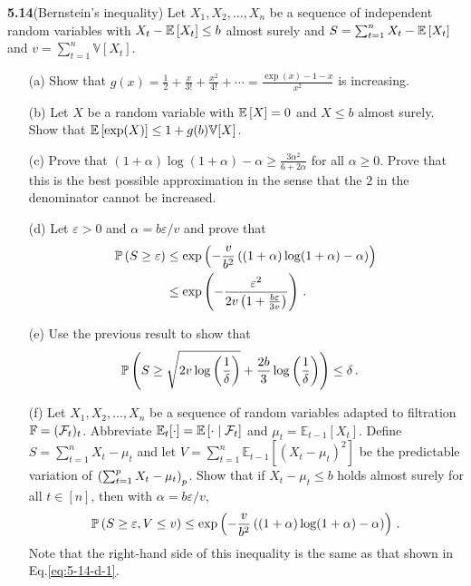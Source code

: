 \noindent \textbf{5.14}(Bernstein’s inequality) Let $X_1,X_2,\ldots,X_n$ be a sequence of independent random variables with $X_t - \mathbb{E} \left[X_t\right] \le b$ almost surely and $S= \sum_{t=1}^n X_t -\mathbb{E} \left[X_t\right]$ and $v = \sum_{t=1}^n \mathbb{V}[X_t]$.
\begin{enumerate}
	\item[(a)] Show that $g(x) = \frac{1}{2} + \frac{x}{3!}+\frac{x^2}{4!}+\cdots = \frac{\exp (x) - 1 -x}{x^2}$ is increasing.
	\item[(b)] Let $X$ be a random variable with $\mathbb{E} \left[X\right]=0$ and $X\le b$ almost surely. Show that $\mathbb{E} \left[\exp (X)\right] \le 1+g(b)\mathbb{V}[X]$.
	\item[(c)] Prove that $(1+\alpha)\log(1+\alpha) - \alpha \ge \frac{3\alpha^2}{6+2\alpha}$ for all $\alpha\ge 0$. Prove that this is the best possible approximation in the sense that the $2$ in the denominator cannot be increased.
	\item[(d)] Let $\varepsilon > 0$ and $\alpha = b\varepsilon/v$ and prove that
	\begin{align}
		\mathbb{P} \left(S\ge \varepsilon\right) &\le \exp\left( -\frac{v}{b^2}\left( (1+\alpha)\log(1+\alpha) -\alpha\right) \right) \label{eq:5-14-d-1}\\
		&\le \exp\left(- \frac{\varepsilon^2}{2v\left( 1+\frac{b\varepsilon}{3v} \right)} \right) \label{eq:5-14-d-2}\,.
	\end{align}
	\item[(e)] Use the previous result to show that
	\begin{align*}
		\mathbb{P} \left(S\ge \sqrt{2v \log\left(\frac{1}{\delta}\right)}+ \frac{2b}{3}\log\left(\frac{1}{\delta}\right)\right)  &\le \delta \,.
	\end{align*}
	\item[(f)] Let $X_1,X_2,\ldots,X_n$ be a sequence of random variables adapted to filtration $\mathbb{F} = (\mathcal{F}_t)_t$. Abbreviate $\mathbb{E}_t[\cdot] = \mathbb{E} \left[\cdot \mid \mathcal{F}_t\right]$ and $\mu_t = \mathbb{E}_{t-1}[X_t]$. Define $S = \sum_{t=1}^n X_t - \mu_t$ and let $V = \sum_{t=1}^n \mathbb{E}_{t-1}[(X_t - \mu_t)^2]$ be the predictable variation of $\left(\sum_{t=1}^p X_t-\mu_t \right)_p$. Show that if $X_t - \mu_t \le b$ holds almost surely for all $t \in [n]$, then with $\alpha = b\varepsilon / v$, 
	\begin{align*}
		\mathbb{P} \left(S\ge \varepsilon,V\le v\right) \le \exp\left( -\frac{v}{b^2}\left( (1+\alpha)\log (1+\alpha)-\alpha \right) \right) \,.
	\end{align*}
	Note that the right-hand side of this inequality is the same as that shown in Eq.\eqref{eq:5-14-d-1}.
\end{enumerate}

